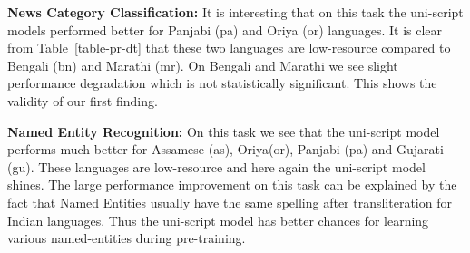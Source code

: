 \documentclass[11pt]{article}
\begin{document}
\textbf{News Category Classification:} 
It is interesting that on this task the uni-script models performed better for Panjabi (pa) and Oriya (or) languages. It is clear from Table~\ref{table-pr-dt} that these two languages are low-resource compared to Bengali (bn) and Marathi (mr). On Bengali and Marathi we see slight performance degradation which is not statistically significant. This shows the validity of our first finding.

\textbf{Named Entity Recognition:}
On this task we see that the uni-script model performs much better for Assamese (as), Oriya(or), Panjabi (pa) and Gujarati (gu). These languages are low-resource and here again the uni-script model shines. The large performance improvement on this task can be explained by the fact that Named Entities usually have the same spelling after transliteration for Indian languages. Thus the uni-script model has better chances for learning various named-entities during pre-training.
\end{document}
